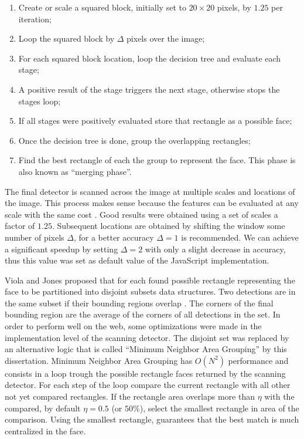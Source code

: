 \begin{enumerate}
  \item Create or scale a squared block, initially set to $20\times20$ pixels, by $1.25$ per iteration;
  \item Loop the squared block by $\Delta$ pixels over the image;
  \item For each squared block location, loop the decision tree and evaluate each stage;
  \item A positive result of the stage \cite{Viola2001} triggers the next stage, otherwise stops the stages loop;
  \item If all stages were positively evaluated store that rectangle as a possible face;
  \item Once the decision tree is done, group the overlapping rectangles;
  \item Find the best rectangle of each the group to represent the face. This phase is also known as ``merging phase''.
\end{enumerate}

The final detector is scanned across the image at multiple scales and locations of the image. This process makes sense because the features can be evaluated at any scale with the same cost \cite{Viola2001}. Good results were obtained using a set of scales a factor of $1.25$. Subsequent locations are obtained by shifting the window some number of pixels $\Delta$, for a better accuracy $\Delta=1$ is recommended. We can achieve a significant speedup by setting $\Delta=2$ with only a slight decrease in accuracy, thus this value was set as default value of the JavaScript \cite{International2009} implementation.

Viola and Jones \cite{Viola2001} proposed that for each found possible rectangle representing the face to be partitioned into disjoint subsets data structures. Two detections are in the same subset if their bounding regions overlap \cite{Viola2001}. The corners of the final bounding region are the average of the corners of all detections in the set. In order to perform well on the web, some optimizations were made in the implementation level of the scanning detector. The disjoint set was replaced by an alternative logic that is called ``Minimum Neighbor Area Grouping'' by this dissertation. Minimum Neighbor Area Grouping has $O(N^2)$ performance \cite{black2007big} and consists in a loop trough the possible rectangle faces returned by the scanning detector. For each step of the loop compare the current rectangle with all other not yet compared rectangles. If the rectangle area overlaps more than $\eta$ with the compared, by default $\eta=0.5$ (or $50\%$), select the smallest rectangle in area of the comparison. Using the smallest rectangle, guarantees that the best match is much centralized in the face.

